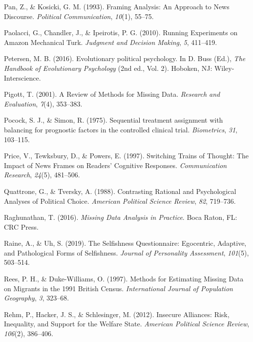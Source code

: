 \documentclass[12pt,econ]{sources/authesis}
\begin{document}
\leavevmode\hypertarget{ref-pan_framing_1993}{}%
Pan, Z., \& Kosicki, G. M. (1993). Framing Analysis: An Approach to News Discourse. \emph{Political Communication}, \emph{10}(1), 55--75.

\leavevmode\hypertarget{ref-paolacci_2010_running}{}%
Paolacci, G., Chandler, J., \& Ipeirotis, P. G. (2010). Running Experiments on Amazon Mechanical Turk. \emph{Judgment and Decision Making}, \emph{5}, 411--419.

\leavevmode\hypertarget{ref-petersen_2016_evolutionary}{}%
Petersen, M. B. (2016). Evolutionary political psychology. In D. Buss (Ed.), \emph{The Handbook of Evolutionary Psychology} (2nd ed., Vol. 2). Hoboken, NJ: Wiley-Interscience.

\leavevmode\hypertarget{ref-pigott_review_2001}{}%
Pigott, T. (2001). A Review of Methods for Missing Data. \emph{Research and Evaluation}, \emph{7}(4), 353--383.

\leavevmode\hypertarget{ref-pocock_1975_sequential}{}%
Pocock, S. J., \& Simon, R. (1975). Sequential treatment assignment with balancing for prognostic factors in the controlled clinical trial. \emph{Biometrics}, \emph{31}, 103--115.

\leavevmode\hypertarget{ref-price_switching_1997}{}%
Price, V., Tewksbury, D., \& Powers, E. (1997). Switching Trains of Thought: The Impact of News Frames on Readers' Cognitive Responses. \emph{Communication Research}, \emph{24}(5), 481--506.

\leavevmode\hypertarget{ref-quattrone_1988_contrasting}{}%
Quattrone, G., \& Tversky, A. (1988). Contrasting Rational and Psychological Analyses of Political Choice. \emph{American Political Science Review}, \emph{82}, 719--736.

\leavevmode\hypertarget{ref-raghunathan_2016_missing}{}%
Raghunathan, T. (2016). \emph{Missing Data Analysis in Practice}. Boca Raton, FL: CRC Press.

\leavevmode\hypertarget{ref-raine_2019_selfishness}{}%
Raine, A., \& Uh, S. (2019). The Selfishness Questionnaire: Egocentric, Adaptive, and Pathological Forms of Selfishness. \emph{Journal of Personality Assessment}, \emph{101}(5), 503--514.

\leavevmode\hypertarget{ref-rees_1997_methods}{}%
Rees, P. H., \& Duke-Williams, O. (1997). Methods for Estimating Missing Data on Migrants in the 1991 British Census. \emph{International Journal of Population Geography}, \emph{3}, 323--68.

\leavevmode\hypertarget{ref-rehm_2012_insecure}{}%
Rehm, P., Hacker, J. S., \& Schlesinger, M. (2012). Insecure Alliances: Risk, Inequality, and Support for the Welfare State. \emph{American Political Science Review}, \emph{106}(2), 386--406.
\end{document}
